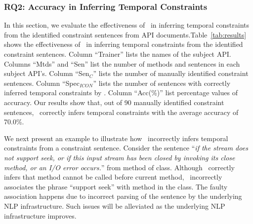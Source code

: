 %
%

\subsubsection{RQ2: Accuracy in Inferring Temporal Constraints}

In this section, we evaluate the effectiveness of \tool\ in inferring temporal constraints from the identified constraint sentences from API documents.Table~\ref{tab:results} shows the effectiveness of \tool\ in inferring temporal constraints from the identified constraint sentences.
Column ``Trainer'' lists the names of the subject API. 
Columns ``Mtds'' and ``Sen'' list the number of methods and sentences in each subject API's.
Column ``Sen$_C$'' lists the number of manually identified constraint sentences.
Column ``Spec$_{ICON}$'' lists the number of sentences with correctly inferred temporal constraints by \tool. 
Column ``Acc(\%)'' list percentage values of accuracy. 
Our results show that, out of 90 manually identified constraint sentences, \tool\ correctly infers temporal constraints with the average accuracy of 70.0\%.

We next present an example to illustrate how \tool\ incorrectly infers temporal constraints from a constraint sentence. Consider the sentence ``\textit{if the stream does not support seek, or if this input stream has been closed by invoking its close method, or an I/O error occurs.}'' from  method of  class. Although \tool\ correctly infers that method  cannot be called before current method, \tool\ incorrectly associates the phrase ``support seek'' with method  in the class. The faulty association happens due to incorrect parsing of the sentence by the underlying NLP infrastructure. Such issues will be alleviated as the underlying NLP infrastructure improves.   


